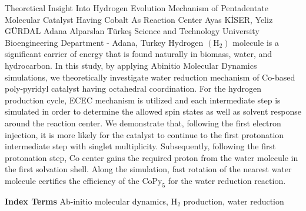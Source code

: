 
    \begin{abstract_online}{Theoretical Insight Into Hydrogen Evolution Mechanism of Pentadentate Molecular Catalyst Having Cobalt As Reaction Center}{%
        Ayas KİSER, Yeliz GÜRDAL}{%
        }{%
        Adana Alparslan Türkeş Science and Technology University Bioengineering Department - Adana, Turkey}
    Hydrogen $\left(\mathrm{H}_{2}\right)$ molecule is a significant carrier of energy that is found naturally in biomass, water, and hydrocarbon. In this study, by applying Abinitio Molecular Dynamics simulations, we theoretically investigate water reduction mechanism of Co-based poly-pyridyl catalyst having octahedral coordination. For the hydrogen production cycle, ECEC mechanism is utilized and each intermediate step is simulated in order to determine the allowed spin states as well as solvent response around the reaction center. We demonstrate that, following the first electron injection, it is more likely for the catalyst to continue to the first protonation intermediate step with singlet multiplicity. Subsequently, following the first protonation step, Co center gains the required proton from the water molecule in the first solvation shell. Along the simulation, fast rotation of the nearest water molecule certifies the efficiency of the $\mathrm{CoPy}_{5}$ for the water reduction reaction. 
    
            \textbf{Index Terms} \newline{}Ab-initio molecular dynamics, $\mathrm{H}_{2}$ production, water reduction
    \end{abstract_online}
    